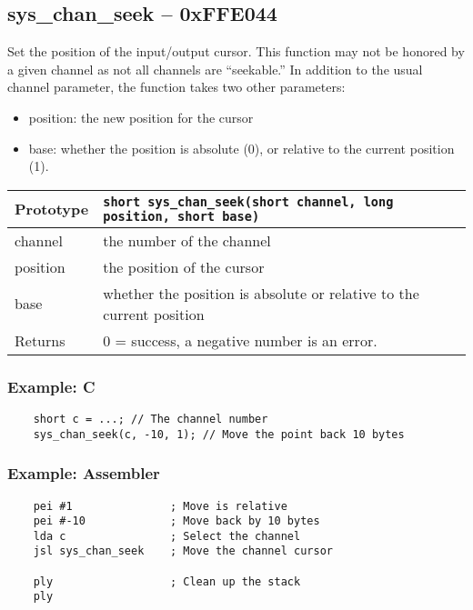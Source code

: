 \subsection*{sys\_chan\_seek -- 0xFFE044}
Set the position of the input/output cursor. This function may not be honored by a given channel as not all channels are ``seekable.''
In addition to the usual channel parameter, the function takes two other parameters:
\begin{itemize}
\item position: the new position for the cursor
\item base: whether the position is absolute (0), or relative to the current position (1).
\end{itemize}

\bigskip

\begin{tabular}{|l||l|} \hline
Prototype & \lstinline!short sys_chan_seek(short channel, long position, short base)! \\ \hline
channel & the number of the channel \\ \hline
position & the position of the cursor \\ \hline
base & whether the position is absolute or relative to the current position \\ \hline
Returns & 0 = success, a negative number is an error. \\ \hline
\end{tabular}

\subsubsection*{Example: C}
\begin{lstlisting}
    short c = ...; // The channel number
    sys_chan_seek(c, -10, 1); // Move the point back 10 bytes
\end{lstlisting}

\subsubsection*{Example: Assembler}
\begin{verbatim}
    pei #1               ; Move is relative
    pei #-10             ; Move back by 10 bytes
    lda c                ; Select the channel
    jsl sys_chan_seek    ; Move the channel cursor

    ply                  ; Clean up the stack
    ply
\end{verbatim}

